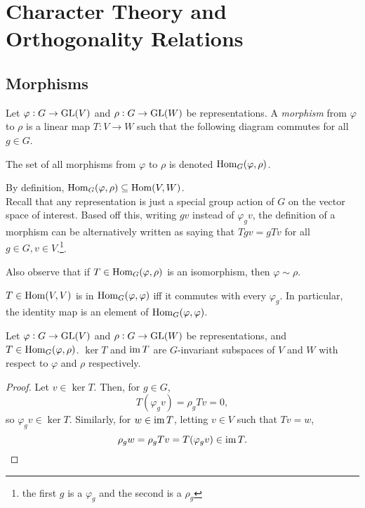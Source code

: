 \section{Character Theory and Orthogonality Relations}

	\subsection{Morphisms}

		\begin{fdef}[Morphism]
			Let $\varphi : G \to \operatorname{GL}(V)$ and $\rho : G \to \operatorname{GL}(W)$ be representations. A \emph{morphism} from $\varphi$ to $\rho$ is a linear map $T : V \to W$ such that the following diagram commutes for all $g \in G$.
			\begin{center}
			\end{center}
			The set of all morphisms from $\varphi$ to $\rho$ is denoted $\operatorname{Hom}_G(\varphi,\rho)$.
		\end{fdef}

		By definition, $\operatorname{Hom}_G(\varphi,\rho) \subseteq \operatorname{Hom}(V,W)$.\\

		Recall that any representation is just a special group action of $G$ on the vector space of interest. Based off this, writing $gv$ instead of $\varphi_g v$, the definition of a morphism can be alternatively written as saying that $Tgv = gTv$ for all $g\in G, v \in V$.\footnote{the first $g$ is a $\varphi_g$ and the second is a $\rho_g$}.

		Also observe that if $T \in \operatorname{Hom}_G(\varphi,\rho)$ is an isomorphism, then $\varphi \sim \rho$.

		\begin{remark}
			$T \in \operatorname{Hom}(V,V)$ is in $\operatorname{Hom}_G(\varphi,\varphi)$ iff it commutes with every $\varphi_g$. In particular, the identity map is an element of $\operatorname{Hom}_G(\varphi,\varphi)$.
		\end{remark}

		\begin{fprop}
			Let $\varphi : G \to \operatorname{GL}(V)$ and $\rho : G \to \operatorname{GL}(W)$ be representations, and $T \in \operatorname{Hom}_G(\varphi,\rho)$. $\ker T$ and $\operatorname{im} T$ are $G$-invariant subspaces of $V$ and $W$ with respect to $\varphi$ and $\rho$ respectively.
		\end{fprop}
		\begin{proof}
			Let $v \in \ker T$. Then, for $g \in G$,
			\[ T (\varphi_g v) = \rho_g T v = 0,  \]
			so $\varphi_g v \in \ker T$. Similarly, for $w \in \operatorname{im} T$, letting $v \in V$ such that $Tv = w$, 
			\[ \rho_g w = \rho_g T v = T (\varphi_g v) \in \operatorname{im} T.  \]
		\end{proof}

